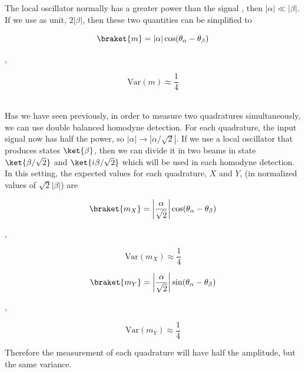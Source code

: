 %
The local oscillator normally has a greater power than the signal
, then $|\alpha| \ll |\beta|$. If we use as unit, $2|\beta|$, then these two quantities can be simplified to
%
\begin{center}
	\begin{minipage}{52mm}
		\noindent
		\begin{equation}
			\label{eq:var_m}
			\braket{m} = |\alpha|\cos({\theta_\alpha - \theta_\beta})
		\end{equation}
	\end{minipage}
	$,\quad$
	\begin{minipage}{34mm}
		\noindent
		\begin{equation}
			\textrm{Var}(m) \approx \frac{1}{4}
		\end{equation}
	\end{minipage}
\end{center}
%
\cite{hans2004}
\\
Has we have seen previously, in order to measure two quadratures simultaneously, we can use double balanced homodyne detection. For each quadrature, the input signal now has half the power, so $|\alpha| \rightarrow |\alpha/\sqrt{2}|$.  If we use a local oscillator that produces states $\ket{\beta}$, then we can divide it in two beams in state $\ket{\beta/\sqrt{2}}$ and $\ket{i\beta/\sqrt{2}}$ which will be used in each homodyne detection. In this setting, the expected values for each quadrature, $X$ and $Y$, (in normalized values of $\sqrt{2}|\beta|$) are
%
\begin{center}
	\begin{minipage}{58mm}
		\noindent
		\begin{equation}
			\braket{m_X} = \left|\frac{\alpha}{\sqrt{2}}\right| \cos({\theta_\alpha - \theta_\beta})
		\end{equation}
	\end{minipage}
	$,\quad$
	\begin{minipage}{37mm}
		\noindent
		\begin{equation}
			\textrm{Var}(m_X) \approx \frac{1}{4}
		\end{equation}
	\end{minipage}
\end{center}
%
%
\begin{center}
	\begin{minipage}{58mm}
		\noindent
		\begin{equation}
			\braket{m_Y} =  \left|\frac{\alpha}{\sqrt{2}}\right| \sin({\theta_\alpha - \theta_\beta})
		\end{equation}
	\end{minipage}
	$,\quad$
	\begin{minipage}{37mm}
		\noindent
		\begin{equation}
			\textrm{Var}(m_Y) \approx \frac{1}{4}
		\end{equation}
	\end{minipage}
\end{center}
%
Therefore the measurement of each quadrature will have half the amplitude, but the same variance.
%
%
%

